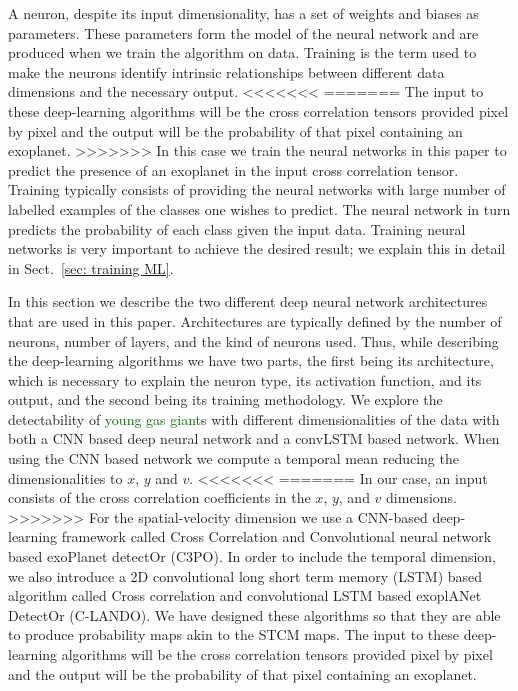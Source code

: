 \documentclass{aa}
\newcommand{\newchange}[1]{\textcolor{darkgreen}{#1}}
\begin{document}
{{A neuron, despite its input dimensionality, has a set of weights and biases as parameters. 
These parameters form the model of the neural network and are produced when we train the algorithm on data.
Training is the term used to make the neurons identify intrinsic relationships between different data dimensions and the necessary output.
<<<<<<<
=======
The input to these deep-learning algorithms will be the cross correlation tensors provided pixel by pixel and the output will be the probability of that pixel containing an exoplanet. %
>>>>>>>
In this case we train the neural networks in this paper to predict the presence of an exoplanet in the input cross correlation tensor.
Training typically consists of providing the neural networks with large number of labelled examples of the classes one wishes to predict.
The neural network in turn predicts the probability of each class given the input data.
Training neural networks is very important to achieve the desired result; we explain this in detail in Sect.~\ref{sec: training ML}.

In this section we describe the two different deep neural network architectures that are used in this paper.
Architectures are typically defined by the number of neurons, number of layers, and the kind of neurons used.
Thus, while describing the deep-learning algorithms we have two parts, the first being its architecture, which is necessary to explain the neuron type, its activation function, and its output, and the second being its training methodology.
We explore the detectability of \newchange{young gas giant}s with different dimensionalities of the data with both a CNN based deep neural network and a convLSTM based network.
When using the CNN based network we compute a temporal mean reducing the dimensionalities to $x$, $y$ and $v$.
<<<<<<<
=======
In our case, an input consists of the cross correlation coefficients in the $x$, $y$, and $v$ dimensions.
>>>>>>>
For the spatial-velocity dimension we use a CNN-based deep-learning framework called Cross Correlation and Convolutional neural network based exoPlanet detectOr (C3PO).
In order to include the temporal dimension, we also introduce a 2D convolutional long short term memory (LSTM) based algorithm called Cross correlation and convolutional LSTM based exoplANet DetectOr (C-LANDO).
We have designed these algorithms so that they are able to produce probability maps akin to the STCM maps. 
The input to these deep-learning algorithms will be the cross correlation tensors provided pixel by pixel and the output will be the probability of that pixel containing an exoplanet. %

}}
\end{document}
